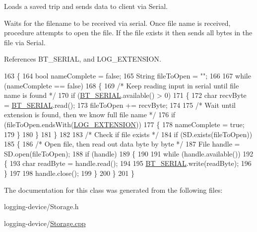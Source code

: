 Loads a saved trip and sends data to client via Serial. 

Waits for the filename to be received via serial. Once file name is received, procedure attempts to open the file. If the file exists it then sends all bytes in the file via Serial. 

References B\+T\+\_\+\+S\+E\+R\+I\+AL, and L\+O\+G\+\_\+\+E\+X\+T\+E\+N\+S\+I\+ON.


\begin{DoxyCode}
163 \{
164   \textcolor{keywordtype}{bool} nameComplete = \textcolor{keyword}{false};
165   String fileToOpen = \textcolor{stringliteral}{""};
166 
167   \textcolor{keywordflow}{while} (nameComplete == \textcolor{keyword}{false})
168   \{
169     \textcolor{comment}{/* Keep reading input in serial until file name is found */}
170     \textcolor{keywordflow}{if} (\hyperlink{_storage_8cpp_ad1e6e6f6fc813b305067b9e1b0777ea6}{BT\_SERIAL}.available() > 0)
171     \{
172       \textcolor{keywordtype}{char} recvByte = \hyperlink{_storage_8cpp_ad1e6e6f6fc813b305067b9e1b0777ea6}{BT\_SERIAL}.read();
173       fileToOpen += recvByte;
174 
175       \textcolor{comment}{/* Wait until extension is found, then we know full file name */}
176       \textcolor{keywordflow}{if} (fileToOpen.endsWith(\hyperlink{_storage_8cpp_a907e440e32d31fd828188004703e3178}{LOG\_EXTENSION}))
177       \{
178         nameComplete = \textcolor{keyword}{true};
179       \}
180     \}
181   \}
182 
183   \textcolor{comment}{/* Check if file exists */}
184   \textcolor{keywordflow}{if} (SD.exists(fileToOpen))
185   \{
186     \textcolor{comment}{/* Open file, then read out data byte by byte */}
187     File handle = SD.open(fileToOpen);
188     \textcolor{keywordflow}{if} (handle)
189     \{
190 
191       \textcolor{keywordflow}{while} (handle.available())
192       \{
193         \textcolor{keywordtype}{char} readByte = handle.read();
194 
195         \hyperlink{_storage_8cpp_ad1e6e6f6fc813b305067b9e1b0777ea6}{BT\_SERIAL}.write(readByte);
196       \}
197 
198       handle.close();
199     \}
200   \}
201 \}
\end{DoxyCode}


The documentation for this class was generated from the following files\+:\begin{DoxyCompactItemize}
\item 
logging-\/device/Storage.\+h\item 
logging-\/device/\hyperlink{_storage_8cpp}{Storage.\+cpp}\end{DoxyCompactItemize}

